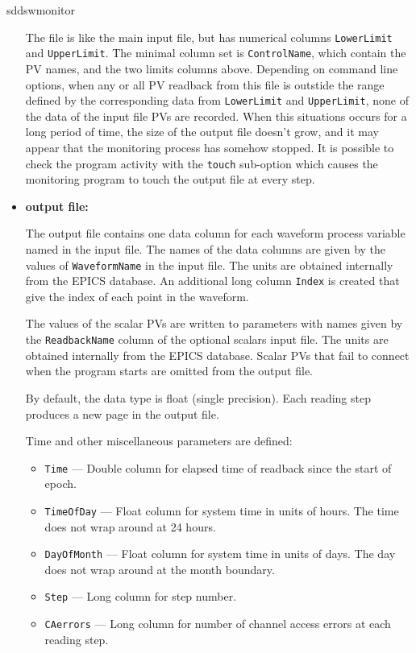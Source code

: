 \begin{sddsprog}{sddswmonitor}
\begin{itemize}
The file is like the main input file, but has numerical columns \verb+LowerLimit+ and \verb+UpperLimit+.
The minimal column set is \verb+ControlName+, which contain the PV names, and the two limits columns above.
Depending on command line options, when any or all PV readback from this file
is outstide the range defined by the corresponding data from \verb+LowerLimit+ and \verb+UpperLimit+,
none of the data of the input file PVs are recorded. 
When this situations occurs for a long period of time, the size of the output file doesn't
grow, and it may appear that the monitoring process has somehow stopped.
It is possible to check the program activity with the \verb+touch+ sub-option
which causes the monitoring program to touch the output file at every step.

\item \textbf{output file:}\par
The output file contains one data column for each waveform process variable named in the input file. The names
of the data columns are given by the values of {\verb+WaveformName+} in the input file. The units are obtained
internally from the EPICS database. An additional long column \verb+Index+ is created that give the index
of each point in the waveform.

The values of the scalar PVs are written to parameters with names given by the {\tt ReadbackName} column
of the optional scalars input file. The units are obtained internally from the EPICS database. Scalar
PVs that fail to connect when the program starts are omitted from the output file.

By default, the data type is float (single precision). Each reading step produces a new page in the output file.

Time and other miscellaneous parameters are defined: 
\begin{itemize}
        \item {\tt Time} --- Double column for elapsed time of readback since the start of epoch.
        \item {\tt TimeOfDay} --- Float column for system time in units of hours. The time does not wrap around at 24 hours.
        \item {\tt DayOfMonth} --- Float column for system time in units of days. The day does not wrap around at the month boundary.
        \item {\tt Step} --- Long column for step number.
        \item {\tt CAerrors} --- Long column for number of channel access errors at each reading step. 
\end{itemize}


\end{itemize}
\end{sddsprog}

